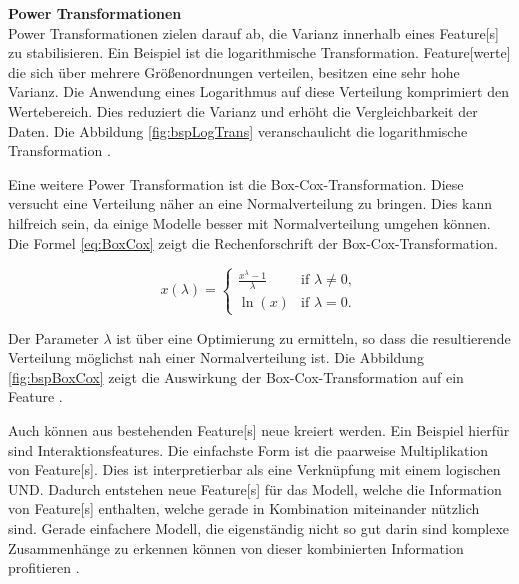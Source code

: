 \textbf{Power Transformationen}\\
Power Transformationen zielen darauf ab, die Varianz innerhalb eines \gls{Feature}[s] zu stabilisieren. Ein Beispiel ist die logarithmische Transformation. \gls{Feature}[werte] die sich über mehrere Größenordnungen verteilen, besitzen eine sehr hohe Varianz. Die Anwendung eines Logarithmus auf diese Verteilung komprimiert den Wertebereich. Dies reduziert die Varianz und erhöht die Vergleichbarkeit der Daten. Die Abbildung \ref{fig:bspLogTrans} veranschaulicht die logarithmische Transformation \cite{Zheng.2018}. 


Eine weitere Power Transformation ist die Box-Cox-Transformation. Diese versucht eine Verteilung näher an eine Normalverteilung zu bringen. Dies kann hilfreich sein, da einige Modelle besser mit Normalverteilung umgehen können. Die Formel \ref{eq:BoxCox} zeigt die Rechenforschrift der Box-Cox-Transformation.

\begin{equation}
    \label{eq:BoxCox}
    x(\lambda) = 
    \begin{cases} 
    \frac{x^\lambda - 1}{\lambda} & \text{if } \lambda \neq 0, \\
    \ln(x) & \text{if } \lambda = 0.
    \end{cases}
\end{equation}

Der Parameter \(\lambda\) ist über eine Optimierung zu ermitteln, so dass die resultierende Verteilung möglichst nah einer Normalverteilung ist. Die Abbildung \ref{fig:bspBoxCox} zeigt die Auswirkung der Box-Cox-Transformation auf ein \gls{Feature} \cite{Zheng.2018}. 


Auch können aus bestehenden \gls{Feature}[s] neue kreiert werden. Ein Beispiel hierfür sind Interaktionsfeatures. Die einfachste Form ist die paarweise Multiplikation von \gls{Feature}[s]. Dies ist interpretierbar als eine Verknüpfung mit einem logischen UND. Dadurch entstehen neue \gls{Feature}[s] für das Modell, welche die Information von \gls{Feature}[s] enthalten, welche gerade in Kombination miteinander nützlich sind. Gerade einfachere Modell, die eigenständig nicht so gut darin sind komplexe Zusammenhänge zu erkennen können von dieser kombinierten Information profitieren \cite{Zheng.2018}.\par

